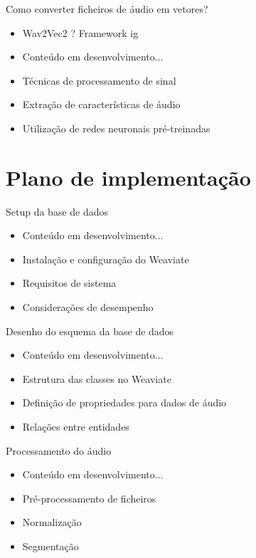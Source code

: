 \documentclass{beamer}
\begin{document}
\begin{frame}{Como converter ficheiros de áudio em vetores?}
    \begin{itemize}
        \item Wav2Vec2 ? Framework ig
        \item Conteúdo em desenvolvimento...
        \item Técnicas de processamento de sinal
        \item Extração de características de áudio
        \item Utilização de redes neuronais pré-treinadas
    \end{itemize}
\end{frame}

\section{Plano de implementação}

\begin{frame}{Setup da base de dados}
    \begin{itemize}
        \item Conteúdo em desenvolvimento...
        \item Instalação e configuração do Weaviate
        \item Requisitos de sistema
        \item Considerações de desempenho
    \end{itemize}
\end{frame}

\begin{frame}{Desenho do esquema da base de dados}
    \begin{itemize}
        \item Conteúdo em desenvolvimento...
        \item Estrutura das classes no Weaviate
        \item Definição de propriedades para dados de áudio
        \item Relações entre entidades
    \end{itemize}
\end{frame}

\begin{frame}{Processamento do áudio}
    \begin{itemize}
        \item Conteúdo em desenvolvimento...
        \item Pré-processamento de ficheiros
        \item Normalização
        \item Segmentação
    \end{itemize}
\end{frame}
\end{document}
